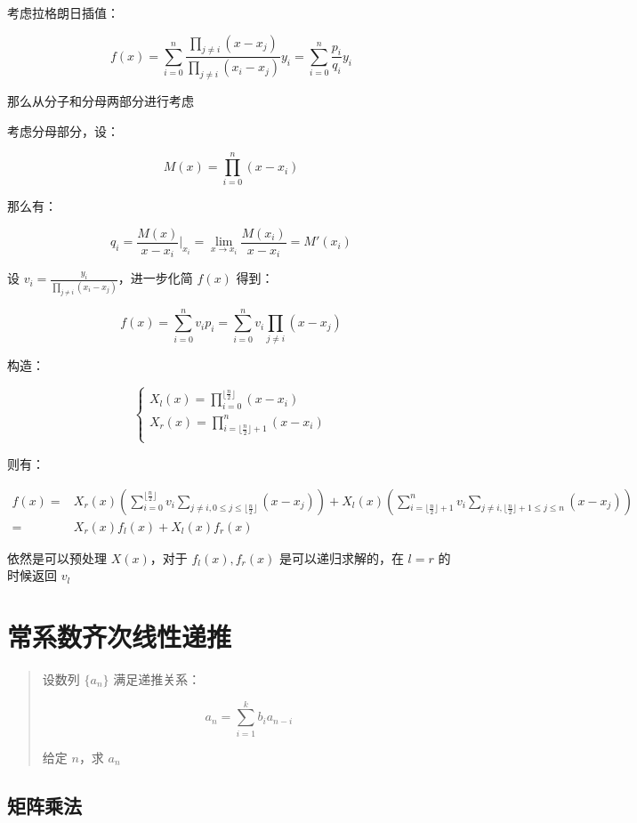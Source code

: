 \documentclass[UTF8]{article}
\begin{document}
考虑拉格朗日插值：

$$
f(x)=\sum_{i=0}^{n}\frac{\prod_{j \not= i}(x-x_j)}{\prod_{j \not= i}(x_i-x_j)}y_i=\sum_{i=0}^{n}\frac{p_i}{q_i}y_i
$$

那么从分子和分母两部分进行考虑

考虑分母部分，设：

$$
M(x)=\prod_{i=0}^{n}(x-x_i)
$$

那么有：

$$
q_i=\frac{M(x)}{x-x_i}\Big|_{x_i}=\lim_{x \to x_i} \frac{M(x_i)}{x-x_i}=M'(x_i)
$$

设 $v_i=\frac{y_i}{\prod_{j \not= i}(x_i-x_j)}$，进一步化简 $f(x)$ 得到：

$$
f(x)=\sum_{i=0}^{n}v_ip_i=\sum_{i=0}^{n}v_i\prod_{j \not =i}(x-x_j)
$$

构造：

$$
\begin{cases}
X_l(x)=\prod_{i=0}^{\lfloor \frac{n}{2} \rfloor} (x-x_i) \\
X_r(x)=\prod_{i=\lfloor \frac{n}{2} \rfloor+1}^{n} (x-x_i) \\
\end{cases}
$$

则有：

$$
\begin{aligned}
f(x)
=&X_r(x)\left(\sum_{i=0}^{\lfloor \frac{n}{2} \rfloor} v_i \sum_{j \not=i,0 \le j \le \lfloor \frac{n}{2} \rfloor}(x-x_j) \right)+X_l(x)\left( \sum_{i=\lfloor \frac{n}{2} \rfloor+1}^{n}v_i \sum_{j \not= i, \lfloor \frac{n}{2} \rfloor+1 \le j \le n} (x-x_j) \right) \\
=&X_r(x)f_l(x)+X_l(x)f_r(x)
\end{aligned}
$$

依然是可以预处理 $X(x)$，对于 $f_l(x),f_r(x)$ 是可以递归求解的，在 $l=r$ 的时候返回 $v_l$

\section{常系数齐次线性递推}

\begin{quotation}
    设数列 $\{a_n\}$ 满足递推关系：

    $$
    a_n=\sum_{i=1}^{k}b_ia_{n-i}
    $$
    
    给定 $n$，求 $a_n$
\end{quotation}

\subsection{矩阵乘法}
\end{document}
